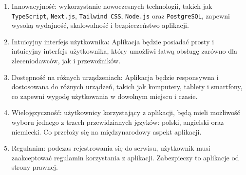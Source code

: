 \begin{enumerate}
    \item Innowacyjność: wykorzystanie nowoczesnych technologii, takich jak \texttt{TypeScript}, \texttt{Next.js}, \texttt{Tailwind CSS}, \texttt{Node.js} oraz \texttt{PostgreSQL}, zapewni wysoką wydajność, skalowalność i bezpieczeństwo aplikacji.
    \item Intuicyjny interfejs użytkownika: Aplikacja będzie posiadać prosty i intuicyjny interfejs użytkownika, który umożliwi łatwą obsługę zarówno dla zleceniodawców, jak i przewoźników.
    \item Dostępność na różnych urządzeniach: Aplikacja będzie responsywna i dostosowana do różnych urządzeń, takich jak komputery, tablety i smartfony, co zapewni wygodę użytkowania w dowolnym miejscu i czasie.
    \item Wielojęzyczność: użytkownicy korzystający z aplikacji, będą mieli możliwość wyboru jednego z trzech przewidzianych języków: polski, angielski oraz niemiecki. Co przełoży się na międzynarodowy aspekt aplikacji.
    \item Regulanim: podczas rejestrowania się do serwisu, użytkownik musi zaakceptować regulamin korzystania z aplikacji. Zabezpieczy to aplikacje od strony prawnej.
\end{enumerate}


